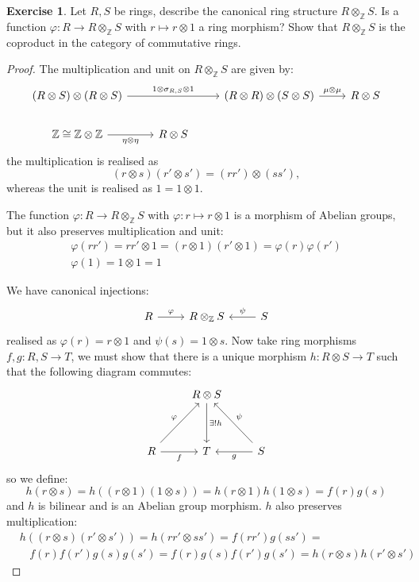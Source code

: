 \documentclass[8pt]{article}
\theoremstyle{definition}
\theoremstyle{definition}
\theoremstyle{definition}
\theoremstyle{definition}
\theoremstyle{definition}
\theoremstyle{definition}
\theoremstyle{definition}
\theoremstyle{definition}
\theoremstyle{definition}
\theoremstyle{definition}
\theoremstyle{definition}
\theoremstyle{definition}
\theoremstyle{definition}
\newtheorem{exercise}{Exercise}[section]
\theoremstyle{definition}
\theoremstyle{question}
\begin{document}
\begin{exercise}
  Let $R, S$ be rings, describe the canonical ring structure $R \otimes_{\mathbb{Z}} S$. 
  Is a function $\varphi : R \to R \otimes_{\mathbb{Z}} S$ with $r \mapsto r \otimes 1$ a ring morphism? Show that
  $R \otimes_{\mathbb{Z}} S$ is the coproduct in the category of commutative rings.
\end{exercise}

\begin{proof}
  The multiplication and unit on $R \otimes_{\mathbb{Z}} S$ are given by:
  \[
  \begin{tikzcd}
  (R \otimes S) \otimes (R \otimes S) \ar[rr, "1 \otimes \sigma_{R, S} \otimes 1"] && (R \otimes R) \otimes (S \otimes S) \ar[r, "\mu \otimes \mu"] & R \otimes S \\
  \mathbb{Z} \cong \mathbb{Z} \otimes \mathbb{Z} \ar[r, "\eta \otimes \eta"'] & R \otimes S
  \end{tikzcd}
  \]
  the multiplication is realised as
  \[(r \otimes s)(r' \otimes s') = (rr') \otimes (ss'),
  \]
  whereas the unit is realised as $1 = 1 \otimes 1$.

  The function $\varphi : R \to R \otimes_{\mathbb{Z}} S$ with $\varphi : r \mapsto r \otimes 1$ is a morphism of Abelian groups,
  but it also preserves multiplication and unit:
  \[
  \begin{array}{lll}
    & \varphi(rr') = rr' \otimes 1 = (r \otimes 1)(r' \otimes 1) = \varphi(r) \varphi(r') & \\
    & \varphi(1) = 1 \otimes 1 = 1&
  \end{array}
  \]

  We have canonical injections:
  \[
  \begin{tikzcd}
  R \ar[r, "\varphi"] & R \otimes_{\mathbb{Z}} S & S \ar[l, "\psi"']
  \end{tikzcd}
  \]
  realised as $\varphi(r) = r \otimes 1$ and $\psi(s) = 1 \otimes s$. Now take ring morphisms
  $f, g : R, S \to T$, we must show that there is a unique morphism $h : R \otimes S \to T$ such that the following diagram commutes:
  \[
  \begin{tikzcd}
    & R \otimes S \ar[dd, "\exists ! h"] \\
    \\
    R \ar[r, "f"'] \ar[uur, "\varphi"] & T & S \ar[l, "g"] \ar[uul, "\psi"']
  \end{tikzcd}
  \]
  so we define:
  \[
  h(r \otimes s) = h((r \otimes 1) (1 \otimes s)) = h(r \otimes 1)h(1 \otimes s) = f(r) g(s)
  \]
  and $h$ is bilinear and is an Abelian group morphism. $h$ also preserves multiplication:
  \[
  \begin{array}{lll}
  & h((r \otimes s)(r' \otimes s')) = h(rr' \otimes ss') = f(rr') g(ss') = & \\
  & \:\:\:\: f(r) f(r') g(s) g(s') = f(r) g(s) f(r') g(s') = h(r \otimes s) h(r' \otimes s') &
  \end{array}
  \]
\end{proof}
\end{document}
